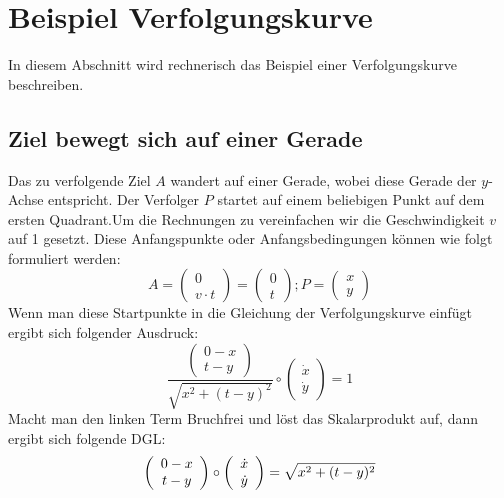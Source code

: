%
%
%
\section{Beispiel Verfolgungskurve
\label{lambertw:section:teil4}}
In diesem Abschnitt wird rechnerisch das Beispiel einer Verfolgungskurve beschreiben.

\subsection{Ziel bewegt sich auf einer Gerade
\label{lambertw:subsection:malorum}}
Das zu verfolgende Ziel \(A\) wandert auf einer Gerade, wobei diese Gerade der \(y\)-Achse entspricht. Der Verfolger \(P\) startet auf einem beliebigen Punkt auf dem ersten Quadrant.Um die Rechnungen zu vereinfachen wir die Geschwindigkeit \(v\) auf 1 gesetzt. Diese Anfangspunkte oder Anfangsbedingungen können wie folgt formuliert werden:
\begin{equation}
	A
	=
	\left( \begin{array}{c} 0 \\ v \cdot t \end{array} \right)
	=
	\left( \begin{array}{c} 0 \\ t \end{array} \right)
	;
	P
	=
	\left( \begin{array}{c} x \\ y \end{array} \right)
	\label{lambertw:equation2}
\end{equation}
Wenn man diese Startpunkte in die Gleichung der Verfolgungskurve einfügt ergibt sich folgender Ausdruck:
\begin{equation}
	\frac{\left( \begin{array}{c} 0-x \\ t-y \end{array} \right)}{\sqrt{x^2 + (t-y)^2}}
	\circ
	\left(\begin{array}{c} \dot{x} \\ \dot{y} \end{array}\right)
	=
	1
	\label{lambertw:equation3}
\end{equation}
Macht man den linken Term Bruchfrei und löst das Skalarprodukt auf, dann ergibt sich folgende DGL:
\[
	\left( \begin{array}{c} 0-x \\ t-y \end{array} \right)
	\circ
	\left(\begin{array}{c} \dot{x} \\ \dot{y} \end{array}\right)
	= \sqrt{x^2 + (t-y)^2}\\
\]
